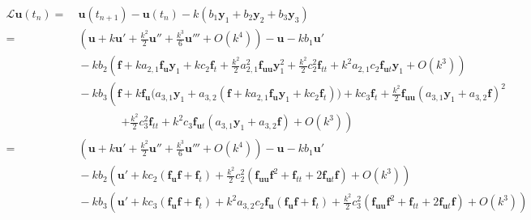 \documentclass[a4paper]{article}
\begin{document}
\begin{equation}
    \begin{aligned}
        \mathcal{L}\mathbf{u}(t_n)
        =&\ \mathbf{u}(t_{n+1})-\mathbf{u}(t_n)
        -k (b_1 \mathbf{y}_1 + b_2 \mathbf{y}_2+b_3 \mathbf{y}_3)\\
        =&\ \left(
            \mathbf{u}+k\mathbf{u}'+\frac{k^2}{2}\mathbf{u}''+\frac{k^3}{6}\mathbf{u}'''
            +O(k^4)
        \right)-\mathbf{u}
        -k b_1\mathbf{u}'\\
        &\ -k b_2\left(
            \mathbf{f}+k a_{2,1}\mathbf{f}_{\mathbf{u}}\mathbf{y}_1+k c_2\mathbf{f}_t
            +\frac{k^2}{2}a_{2,1}^2 \mathbf{f}_{\mathbf{uu}}\mathbf{y}_1^2
            +\frac{k^2}{2} c_2^2 \mathbf{f}_{tt}
            +k^2 a_{2,1} c_2 \mathbf{f}_{\mathbf{u}t}\mathbf{y}_1
            + O(k^3)
        \right)\\
        &\ -k b_3\left(
            \mathbf{f}
            +k \mathbf{f}_{\mathbf{u}}\big(a_{3,1}\mathbf{y}_1
            +a_{3,2}(\mathbf{f}+k a_{2,1}\mathbf{f}_{\mathbf{u}}\mathbf{y}_1+k c_2\mathbf{f}_t)\big)+k c_3\mathbf{f}_t
            +\frac{k^2}{2}\mathbf{f}_{\mathbf{uu}}(a_{3,1}\mathbf{y}_1
            +a_{3,2}\mathbf{f})^2
            \right.\\
            &\qquad\qquad \left.
            +\frac{k^2}{2} c_3^2 \mathbf{f}_{tt}
            +k^2 c_3 \mathbf{f}_{\mathbf{u}t}(a_{3,1}\mathbf{y}_1
            +a_{3,2}\mathbf{f})
            + O(k^3)
        \right)\\
        =&\ \left(
            \mathbf{u}+k\mathbf{u}'+\frac{k^2}{2}\mathbf{u}''+\frac{k^3}{6}\mathbf{u}'''
            +O(k^4)
        \right)-\mathbf{u}
        -k b_1\mathbf{u}'\\
        &\ -k b_2\left(
            \mathbf{u}'+k c_2(\mathbf{f}_{\mathbf{u}}\mathbf{f}+\mathbf{f}_t)
            +\frac{k^2}{2}c_2^2 (\mathbf{f}_{\mathbf{uu}}\mathbf{f}^2
            +\mathbf{f}_{tt}
            +2 \mathbf{f}_{\mathbf{u}t}\mathbf{f})
            + O(k^3)
        \right)\\
        &\ -k b_3\left(
            \mathbf{u}'
            +k c_3(\mathbf{f}_{\mathbf{u}}\mathbf{f}+\mathbf{f}_t)
            +k^2 a_{3,2} c_2 \mathbf{f}_{\mathbf{u}}(
                \mathbf{f}_{\mathbf{u}}\mathbf{f}+\mathbf{f}_t
            )
            +\frac{k^2}{2} c_3^2 (
                \mathbf{f}_{\mathbf{uu}}\mathbf{f}^2
                +\mathbf{f}_{tt}
                +2 \mathbf{f}_{\mathbf{u}t}\mathbf{f}
            )
            + O(k^3)
        \right)\\

\end{aligned}
\end{equation}
\end{document}
